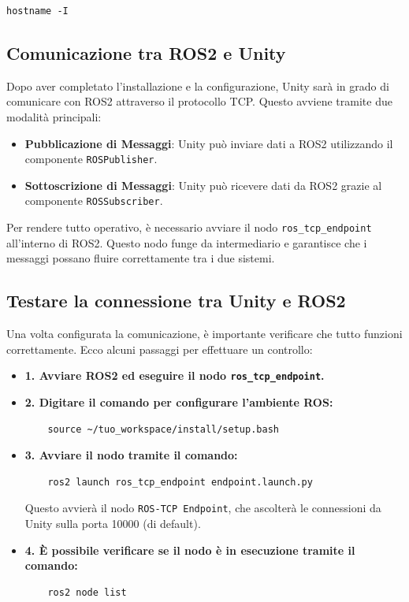 \documentclass[11pt]{report}
\begin{document}
\begin{verbatim}
hostname -I
\end{verbatim}

\subsection*{\textbf{Comunicazione tra ROS2 e Unity}}

Dopo aver completato l’installazione e la configurazione, Unity sarà in grado di comunicare con ROS2 attraverso il protocollo TCP. Questo avviene tramite due modalità principali:

\begin{itemize}
    \item \textbf{Pubblicazione di Messaggi}: Unity può inviare dati a ROS2 utilizzando il componente \texttt{ROSPublisher}.
    \item \textbf{Sottoscrizione di Messaggi}: Unity può ricevere dati da ROS2 grazie al componente \texttt{ROSSubscriber}.
\end{itemize}

Per rendere tutto operativo, è necessario avviare il nodo \texttt{ros\_tcp\_endpoint} all’interno di ROS2. Questo nodo funge da intermediario e garantisce che i messaggi possano fluire correttamente tra i due sistemi.

\subsection*{\textbf{Testare la connessione tra Unity e ROS2}}


Una volta configurata la comunicazione, è importante verificare che tutto funzioni correttamente. Ecco alcuni passaggi per effettuare un controllo:

\begin{itemize}
    \item \textbf{1. Avviare ROS2 ed eseguire il nodo \texttt{ros\_tcp\_endpoint}.}
    \item \textbf{2. Digitare il comando per configurare l'ambiente ROS:}
    \begin{verbatim}
    source ~/tuo_workspace/install/setup.bash
    \end{verbatim}
    \item \textbf{3. Avviare il nodo tramite il comando:}
    \begin{verbatim}
    ros2 launch ros_tcp_endpoint endpoint.launch.py
    \end{verbatim}
    Questo avvierà il nodo \texttt{ROS-TCP Endpoint}, che ascolterà le connessioni da Unity sulla porta 10000 (di default).
    \item \textbf{4. È possibile verificare se il nodo è in esecuzione tramite il comando:}
    \begin{verbatim}
    ros2 node list
    \end{verbatim}
\end{itemize}
\end{document}
